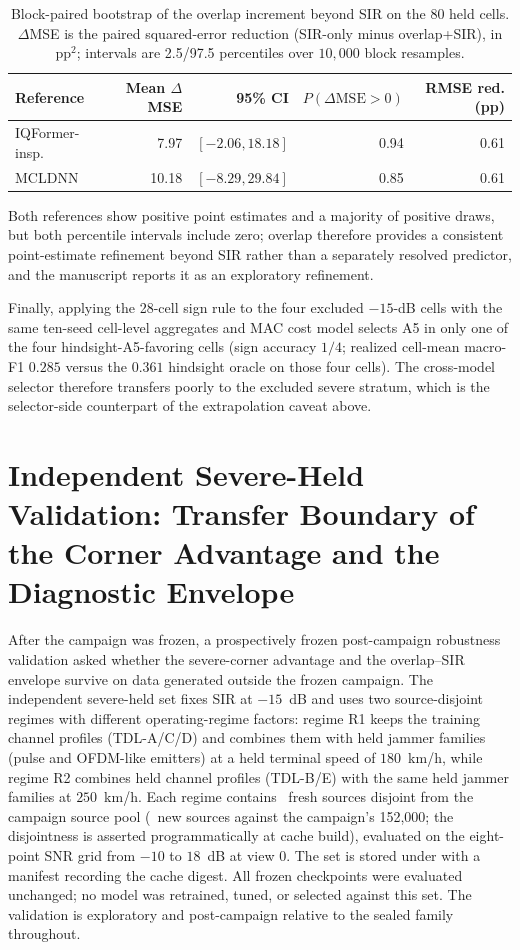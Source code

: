 \documentclass[letterpaper,onecolumn,11pt,journal]{IEEEtran}
\begin{document}
\begin{table}[t]
\centering
\caption{Block-paired bootstrap of the overlap increment beyond SIR on the
80 held cells. $\Delta$MSE is the paired squared-error reduction
(SIR-only minus overlap+SIR), in $\mathrm{pp}^2$; intervals are 2.5/97.5
percentiles over $10{,}000$ block resamples.}
\label{tab:bootpair}
\footnotesize
\setlength{\tabcolsep}{4pt}
\begin{tabular}{lrrrr}
\toprule
Reference & Mean $\Delta$MSE & 95\% CI & $P(\Delta\mathrm{MSE}>0)$ & RMSE red. (pp)\\
\midrule
IQFormer-insp. & 7.97 & $[-2.06, 18.18]$ & 0.94 & 0.61\\
MCLDNN & 10.18 & $[-8.29, 29.84]$ & 0.85 & 0.61\\
\bottomrule
\end{tabular}
\end{table}

Both references show positive point estimates and a majority of positive
draws, but both percentile intervals include zero; overlap therefore provides
a consistent point-estimate refinement beyond SIR rather than a separately
resolved predictor, and the manuscript reports it as an exploratory
refinement.

Finally, applying the 28-cell sign rule to the four excluded $-15$-dB cells
with the same ten-seed cell-level aggregates and MAC cost model selects A5
in only one of the four hindsight-A5-favoring cells (sign accuracy $1/4$;
realized cell-mean macro-F1 $0.285$ versus the $0.361$ hindsight oracle on
those four cells). The cross-model selector therefore transfers poorly to
the excluded severe stratum, which is the selector-side counterpart of the
extrapolation caveat above.

\section{Independent Severe-Held Validation: Transfer Boundary of the Corner
Advantage and the Diagnostic Envelope}
\label{sec:transfer}
After the campaign was frozen, a prospectively frozen post-campaign robustness
validation asked whether the severe-corner advantage and the overlap--SIR
envelope survive on data generated outside the frozen campaign. The
independent severe-held set fixes SIR at $-15$~dB and uses two
source-disjoint regimes with different operating-regime factors: regime R1
keeps the training channel profiles (TDL-A/C/D) and combines them with held
jammer families (pulse and OFDM-like emitters) at a held terminal speed of
$180$~km/h, while regime R2 combines held channel profiles (TDL-B/E) with the
same held jammer families at $250$~km/h. Each regime contains
\SevereHeldSourcesPerRegime\ fresh sources disjoint from the campaign source
pool (\SevereHeldSourcesTotal\ new sources against the campaign's 152,000; the disjointness is
asserted programmatically at cache build), evaluated on the eight-point SNR
grid from $-10$ to $18$~dB at view $0$. The set is stored under
 with a manifest recording the
cache digest. All frozen checkpoints were evaluated unchanged; no model was
retrained, tuned, or selected against this set. The validation is
exploratory and post-campaign relative to the sealed family throughout.
\end{document}
